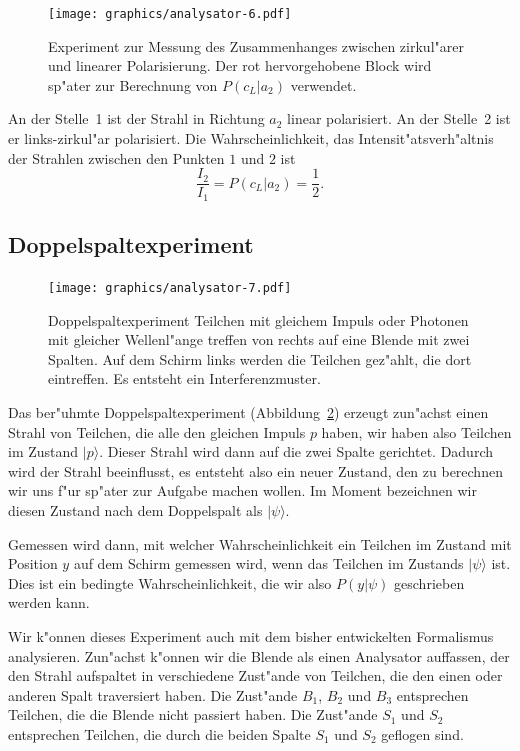 \begin{figure}
\centering
\texttt{[image: graphics/analysator-6.pdf]}
\caption{Experiment zur Messung des Zusammenhanges zwischen zirkul"arer
und linearer Polarisierung. Der rot hervorgehobene Block wird sp"ater
zur Berechnung von $P(c_L|a_2)$ verwendet.
\label{skript:linear-zirkulaer}}
\end{figure}
An der Stelle~1 ist der Strahl in Richtung $a_2$ linear polarisiert.
An der Stelle~2 ist er links-zirkul"ar polarisiert. Die Wahrscheinlichkeit,
das Intensit"atsverh"altnis der Strahlen zwischen den Punkten $1$ und $2$
ist
\begin{equation}
\frac{I_2}{I_1}=P(c_L|a_2)=\frac12.
\label{skript:intensitaetsverhaeltnis}
\end{equation}

\subsection{Doppelspaltexperiment}
\begin{figure}
\centering
\texttt{[image: graphics/analysator-7.pdf]}
\caption{Doppelspaltexperiment Teilchen mit gleichem Impuls oder Photonen
mit gleicher Wellenl"ange treffen von rechts auf eine Blende mit zwei
Spalten. Auf dem Schirm links werden die Teilchen gez"ahlt, die dort
eintreffen. Es entsteht ein Interferenzmuster.
\label{skript:doppelspalt-bild}}
\end{figure}
Das ber"uhmte Doppelspaltexperiment (Abbildung~\ref{skript:doppelspalt-bild})
erzeugt zun"achst einen Strahl
von Teilchen, die alle den gleichen Impuls $p$ haben, wir haben also
Teilchen im Zustand $|p\rangle$. Dieser Strahl
wird dann auf die zwei Spalte gerichtet. Dadurch wird der Strahl
beeinflusst, es entsteht also ein neuer Zustand, den zu berechnen
wir uns f"ur sp"ater zur Aufgabe machen wollen.
Im Moment bezeichnen wir diesen Zustand nach dem Doppelspalt 
als $|\psi\rangle$.

Gemessen wird dann, mit welcher Wahrscheinlichkeit
ein Teilchen im Zustand mit Position $y$ auf dem Schirm
gemessen wird, wenn das Teilchen im Zustands $|\psi\rangle$
ist. Dies ist ein bedingte Wahrscheinlichkeit, die wir also
$P(y|\psi)$ geschrieben werden kann.

Wir k"onnen dieses Experiment auch mit dem bisher entwickelten
Formalismus analysieren.
Zun"achst k"onnen wir die Blende als einen Analysator auffassen, der
den Strahl aufspaltet in verschiedene Zust"ande von Teilchen, die
den einen oder anderen Spalt traversiert haben.
Die Zust"ande $B_1$, $B_2$ und $B_3$ entsprechen Teilchen, die die
Blende nicht passiert haben. Die Zust"ande $S_1$ und $S_2$ entsprechen
Teilchen, die durch die beiden Spalte $S_1$ und $S_2$ geflogen sind.

